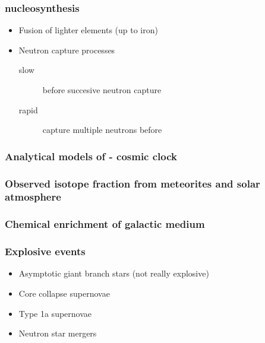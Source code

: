 \begin{frame}
  \frametitle{nucleosynthesis}
  \begin{itemize}
  \item Fusion of lighter elements (up to iron)
  \item Neutron capture processes
    \begin{description}
    \item[slow] \betadecays before succesive neutron capture
    \item[rapid] capture multiple neutrons before \betadecay
    \end{description}
  \end{itemize}
\end{frame}

\begin{frame}
\end{frame}

\begin{frame}
  \frametitle{Analytical models of - cosmic clock}
\end{frame}

\begin{frame}
  \frametitle{Observed isotope fraction from meteorites and solar atmosphere}
\end{frame}


\begin{frame}
  \frametitle{Chemical enrichment of galactic medium}
\end{frame}

\begin{frame}
  \frametitle{Explosive events}
  \begin{itemize}
  \item Asymptotic giant branch stars (not really explosive)
  \item Core collapse supernovae
  \item Type 1a supernovae
  \item Neutron star mergers
  \end{itemize}
\end{frame}

